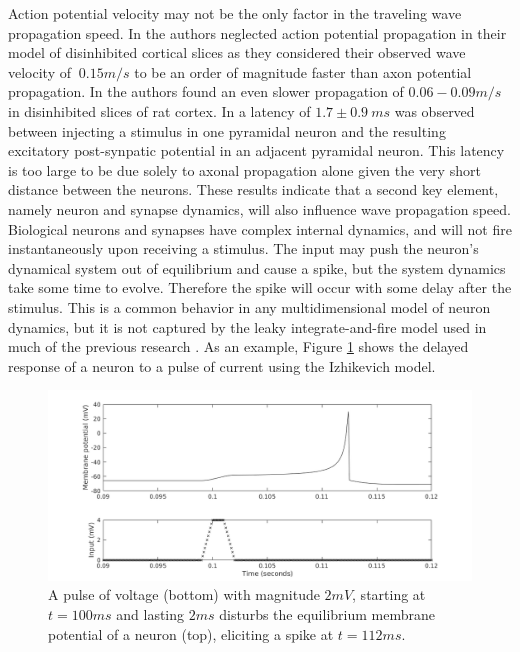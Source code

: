 \documentclass[12pt]{article}
\begin{document}
\color{red}
Action potential velocity may not be the only factor in the traveling wave propagation speed.
In \parencite{Golomb1997} the authors neglected action potential propagation in their model of disinhibited cortical slices as they considered their observed wave velocity of $~0.15 m/s$ to be an order of magnitude faster than axon potential propagation.
In \parencite{Chervin1988} the authors found an even slower propagation of $0.06-0.09 m/s$ in disinhibited slices of rat cortex.
In  \parencite{Markram1997} a latency of $1.7\pm 0.9\ ms$ was observed between injecting a stimulus in one pyramidal neuron and the resulting excitatory post-synpatic potential in an adjacent pyramidal neuron.
This latency is too large to be due solely to axonal propagation alone given the very short distance between the neurons. 
These results indicate that a second key element, namely neuron and synapse dynamics, will also influence wave propagation speed\color{black}.
Biological neurons \color{red}and synapses \color{black} have complex internal dynamics, and will not fire instantaneously upon receiving a stimulus.
The input may push the neuron's dynamical system out of equilibrium and cause a spike, but the system dynamics take some time to evolve.
Therefore the spike will occur with some delay after the stimulus.
This is a common behavior in any multidimensional model of neuron dynamics, but it is not captured by the leaky integrate-and-fire model used in much of the previous research \parencite{keane2015}\parencite{Senk2020}.
As an example, Figure \ref{fig:delay_neuronstep} shows the delayed response of a neuron to a pulse of current using the Izhikevich model.
\begin{figure}[!htb]
 \caption{ A pulse of voltage (bottom) with magnitude $2 mV$, starting at $t=100 ms$ and lasting $2 ms$ disturbs the equilibrium membrane potential of a neuron (top), eliciting a spike at $t=112 ms$. }
 \label{fig:delay_neuronstep}
 \centering
   \includegraphics[width=\textwidth]{fig/WaveSpeed_NeuronStepTest}
\end{figure}
\end{document}
